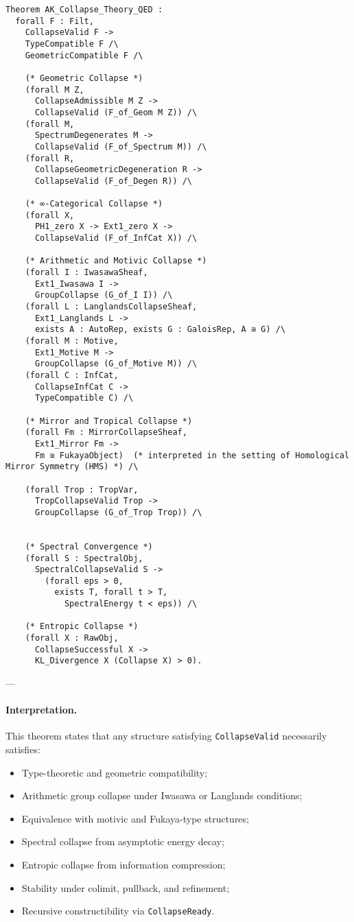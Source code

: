 \documentclass[11pt]{article}
\begin{document}
\begin{lstlisting}[language=Coq]
Theorem AK_Collapse_Theory_QED :
  forall F : Filt,
    CollapseValid F ->
    TypeCompatible F /\
    GeometricCompatible F /\

    (* Geometric Collapse *)
    (forall M Z,
      CollapseAdmissible M Z ->
      CollapseValid (F_of_Geom M Z)) /\
    (forall M,
      SpectrumDegenerates M ->
      CollapseValid (F_of_Spectrum M)) /\
    (forall R,
      CollapseGeometricDegeneration R ->
      CollapseValid (F_of_Degen R)) /\

    (* ∞-Categorical Collapse *)
    (forall X,
      PH1_zero X -> Ext1_zero X ->
      CollapseValid (F_of_InfCat X)) /\

    (* Arithmetic and Motivic Collapse *)
    (forall I : IwasawaSheaf,
      Ext1_Iwasawa I ->
      GroupCollapse (G_of_I I)) /\
    (forall L : LanglandsCollapseSheaf,
      Ext1_Langlands L ->
      exists A : AutoRep, exists G : GaloisRep, A ≅ G) /\
    (forall M : Motive,
      Ext1_Motive M ->
      GroupCollapse (G_of_Motive M)) /\
    (forall C : InfCat,
      CollapseInfCat C ->
      TypeCompatible C) /\

    (* Mirror and Tropical Collapse *)
    (forall Fm : MirrorCollapseSheaf,
      Ext1_Mirror Fm ->
      Fm ≅ FukayaObject)  (* interpreted in the setting of Homological Mirror Symmetry (HMS) *) /\

    (forall Trop : TropVar,
      TropCollapseValid Trop ->
      GroupCollapse (G_of_Trop Trop)) /\


    (* Spectral Convergence *)
    (forall S : SpectralObj,
      SpectralCollapseValid S ->
        (forall eps > 0,
          exists T, forall t > T,
            SpectralEnergy t < eps)) /\

    (* Entropic Collapse *)
    (forall X : RawObj,
      CollapseSuccessful X ->
      KL_Divergence X (Collapse X) > 0).
\end{lstlisting}

---

\paragraph{Interpretation.}
This theorem states that any structure satisfying \texttt{CollapseValid} necessarily satisfies:

\begin{itemize}
  \item Type-theoretic and geometric compatibility;
  \item Arithmetic group collapse under Iwasawa or Langlands conditions;
  \item Equivalence with motivic and Fukaya-type structures;
  \item Spectral collapse from asymptotic energy decay;
  \item Entropic collapse from information compression;
  \item Stability under colimit, pullback, and refinement;
  \item Recursive constructibility via \texttt{CollapseReady}.
\end{itemize}
\end{document}
